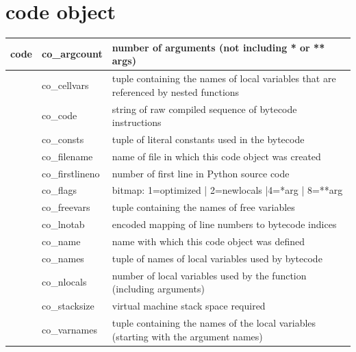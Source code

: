 \documentclass{icldt}
\numberwithin{equation}{section}       %
\begin{document}
{\section{code object}
\begin{tabularx}{\textwidth}{ |l|l|X| }
	\hline
	code & co_argcount & number of arguments (not including * or ** args) \\
	\hline
	& co_cellvars & tuple containing the names of local variables that are referenced by nested functions \\
	\hline
	& co_code & string of raw compiled sequence of bytecode instructions \\
	\hline
	& co_consts & tuple of literal constants used in the bytecode \\
	\hline
	& co_filename & name of file in which this code object was created \\
	\hline
	& co_firstlineno & number of first line in Python source code \\
	\hline
	& co_flags & bitmap: 1=optimized | 2=newlocals |4=*arg | 8=**arg \\
	\hline
	& co_freevars & tuple containing the names of free variables \\
	\hline
	& co_lnotab & encoded mapping of line numbers to bytecode indices \\
	\hline
	& co_name & name with which this code object was defined \\
	\hline
	& co_names & tuple of names of local variables used by bytecode \\
	\hline
	& co_nlocals & number of local variables used by the function (including arguments) \\
	\hline
	& co_stacksize & virtual machine stack space required \\
	\hline
	& co_varnames & tuple containing the names of the local variables (starting with the argument names) \\
	\hline
\end{tabularx}

}
\end{document}
